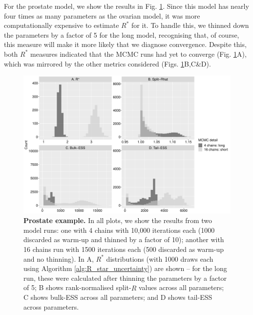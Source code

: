 \documentclass{article}
\begin{document}
For the prostate model, we show the results in Fig. \ref{fig:prostate}. Since this model has nearly four times as many parameters as the ovarian model, it was more computationally expensive to estimate $R^*$ for it. To handle this, we thinned down the parameters by a factor of 5 for the long model, recognising that, of course, this measure will make it more likely that we diagnose convergence. Despite this, both $R^*$ measures indicated that the MCMC runs had yet to converge (Fig. \ref{fig:prostate}A), which was mirrored by the other metrics considered (Figs. \ref{fig:prostate}B,C\&D).

\begin{figure}[!htb]
	\centerline{\includegraphics[width=1.0\textwidth]{../output/prostate.pdf}}
	\caption{\textbf{Prostate example.} In all plots, we show the results from two model runs: one with 4 chains with 10,000 iterations each (1000 discarded as warm-up and thinned by a factor of 10); another with 16 chains run with 1500 iterations each (500 discarded as warm-up and no thinning). In A, $R^*$ distributions (with 1000 draws each using Algorithm \ref{alg:R_star_uncertainty}) are shown -- for the long run, these were calculated after thinning the parameters by a factor of 5; B shows rank-normalised split-$\widehat{R}$ values across all parameters; C shows bulk-ESS across all parameters; and D shows tail-ESS across parameters.}
	\label{fig:prostate}
\end{figure}

	
\end{document}
